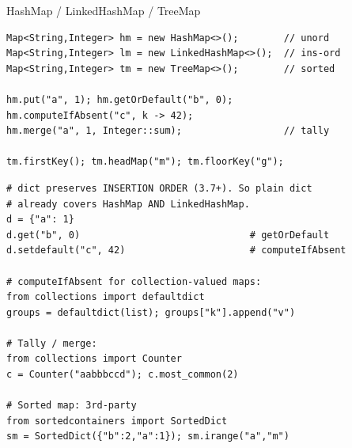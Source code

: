 \documentclass[10pt]{article}
\begin{document}
\begin{construct}{HashMap / LinkedHashMap / TreeMap}
\noindent
\begin{minipage}[t]{0.485\linewidth}
\begin{lstlisting}[style=java, title=Java]
Map<String,Integer> hm = new HashMap<>();        // unord
Map<String,Integer> lm = new LinkedHashMap<>();  // ins-ord
Map<String,Integer> tm = new TreeMap<>();        // sorted

hm.put("a", 1); hm.getOrDefault("b", 0);
hm.computeIfAbsent("c", k -> 42);
hm.merge("a", 1, Integer::sum);                  // tally

tm.firstKey(); tm.headMap("m"); tm.floorKey("g");
\end{lstlisting}
\end{minipage}\hfill
\begin{minipage}[t]{0.485\linewidth}
\begin{lstlisting}[style=python, title=Python]
# dict preserves INSERTION ORDER (3.7+). So plain dict
# already covers HashMap AND LinkedHashMap.
d = {"a": 1}
d.get("b", 0)                              # getOrDefault
d.setdefault("c", 42)                      # computeIfAbsent

# computeIfAbsent for collection-valued maps:
from collections import defaultdict
groups = defaultdict(list); groups["k"].append("v")

# Tally / merge:
from collections import Counter
c = Counter("aabbbccd"); c.most_common(2)

# Sorted map: 3rd-party
from sortedcontainers import SortedDict
sm = SortedDict({"b":2,"a":1}); sm.irange("a","m")
\end{lstlisting}
\end{minipage}
\end{construct}
\end{document}
